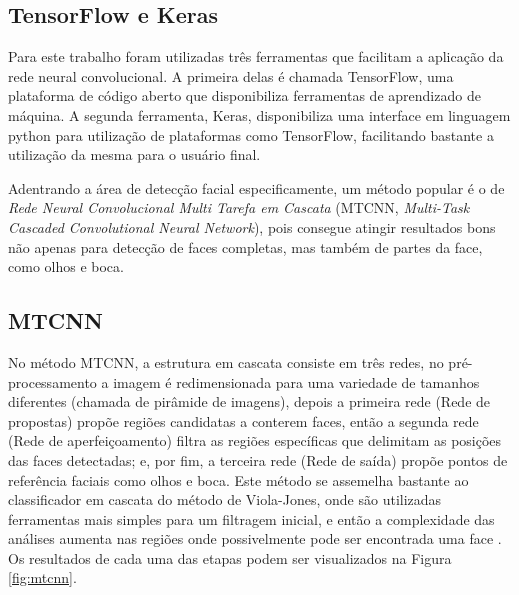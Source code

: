 \subsection{TensorFlow e Keras}

Para este trabalho foram utilizadas três ferramentas que facilitam a aplicação da rede neural convolucional. A primeira delas é chamada TensorFlow, uma plataforma de código aberto que disponibiliza ferramentas de aprendizado de máquina. A segunda ferramenta, Keras, disponibiliza uma interface em linguagem python para utilização de plataformas como TensorFlow, facilitando bastante a utilização da mesma para o usuário final.

Adentrando a área de detecção facial especificamente, um método popular é o de \textit{Rede Neural Convolucional Multi Tarefa em Cascata} (MTCNN, \textit{Multi-Task Cascaded Convolutional Neural Network}), pois consegue atingir resultados bons não apenas para detecção de faces completas, mas também de partes da face, como olhos e boca. \cite{mtcnn}

\subsection{MTCNN}

No método MTCNN, a estrutura em cascata consiste em três redes, no pré-processamento a imagem é redimensionada para uma variedade de tamanhos diferentes (chamada de pirâmide de imagens), depois a primeira rede (Rede de propostas) propõe regiões candidatas a conterem faces, então a segunda rede (Rede de aperfeiçoamento) filtra as regiões específicas que delimitam as posições das faces detectadas; e, por fim, a terceira rede (Rede de saída) propõe pontos de referência faciais como olhos e boca. Este método se assemelha bastante ao classificador em cascata do método de Viola-Jones, onde são utilizadas ferramentas mais simples para um filtragem inicial, e então a complexidade das análises aumenta nas regiões onde possivelmente pode ser encontrada uma face \cite{mtcnn}. Os resultados de cada uma das etapas podem ser visualizados na Figura \ref{fig:mtcnn}.

